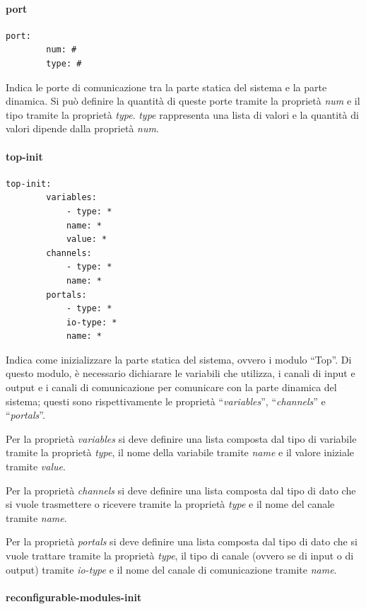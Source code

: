 \documentclass[a4paper,titlepage]{book}
\begin{document}
\paragraph{port}

\begin{lstlisting}[frame=single]
	port:
		num: #
		type: #
\end{lstlisting}

Indica le porte di comunicazione tra la parte statica del sistema e la parte dinamica. Si può definire la quantità di queste porte tramite la proprietà \textit{num} e il tipo tramite la proprietà \textit{type}. \textit{type} rappresenta una lista di valori e la quantità di valori dipende dalla proprietà \textit{num}.
 
\paragraph{top-init} 

\begin{lstlisting}[frame=single]
	top-init:
		variables:
			- type: *
			name: *
			value: *
		channels:
			- type: *
			name: *
		portals:
			- type: *
			io-type: *
			name: *
\end{lstlisting}

Indica come inizializzare la parte statica del sistema, ovvero i modulo ``Top''. Di questo modulo, è necessario dichiarare le variabili che utilizza, i canali di input e output e i canali di comunicazione per comunicare con la parte dinamica del sistema; questi sono rispettivamente le proprietà ``\textit{variables}'', ``\textit{channels}'' e ``\textit{portals}''.

Per la proprietà \textit{variables} si deve definire una lista composta dal tipo di variabile tramite la proprietà \textit{type}, il nome della variabile tramite \textit{name} e il valore iniziale tramite \textit{value}.

Per la proprietà \textit{channels} si deve definire una lista composta dal tipo di dato che si vuole trasmettere o ricevere tramite la proprietà \textit{type} e il nome del canale tramite \textit{name}.

Per la proprietà \textit{portals} si deve definire una lista composta dal tipo di dato che si vuole trattare tramite la proprietà \textit{type}, il tipo di canale (ovvero se di input o di output) tramite \textit{io-type} e il nome del canale di comunicazione tramite \textit{name}.

\paragraph{reconfigurable-modules-init}
\end{document}
